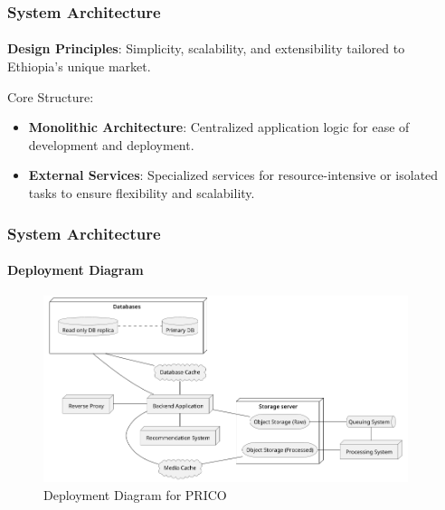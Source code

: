 \documentclass{beamer}
\begin{document}
\begin{frame}
	\frametitle{System Architecture}
	\framesubtitle{}
	\textbf{Design Principles}: Simplicity, scalability, and extensibility tailored to
	Ethiopia’s unique market.

	Core Structure:
	\begin{itemize}
		\item \textbf{Monolithic Architecture}: Centralized application logic for ease of development and deployment.
		\item \textbf{External Services}: Specialized services for resource-intensive or isolated tasks to ensure flexibility and scalability.
	\end{itemize}
\end{frame}

\begin{frame}
	\frametitle{System Architecture}
	\framesubtitle{Deployment Diagram}
	\begin{figure}
		\begin{center}
			\includegraphics[width=0.95\textwidth]{diagrams/deployment}
		\end{center}
		\caption{Deployment Diagram for PRICO}\label{fig:fig1}
	\end{figure}
\end{frame}
\end{document}
